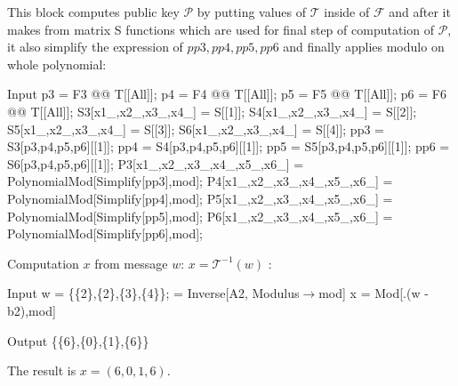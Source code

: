 \documentclass[thesis=M,english]{FITthesis}[2019/12/23]
\begin{document}
\noindent
This block computes public key $\mathcal{P}$ by putting values of $\mathcal{T}$ inside of $\mathcal{F}$ and after it makes from matrix S functions which are used for final step of computation of $\mathcal{P}$, it also simplify the expression of $pp3,pp4,pp5,pp6$ and finally applies modulo on whole polynomial:
\begin{mmaCell}[moredefined={p3, p4, p5, p6, S3, S4, S5, S6, mod, P3, P4, P5, P6, pp3,pp4,pp5,pp6, F3, F4, F5,F6, T, S},morepattern={x1_, x2_, x3_, x4_, x5_, x6_}]{Input}
p3 = F3 @@ T[[All]];
p4 = F4 @@ T[[All]];
p5 = F5 @@ T[[All]];
p6 = F6 @@ T[[All]];
S3[x1_,x2_,x3_,x4_] = S[[1]];
S4[x1_,x2_,x3_,x4_] = S[[2]];
S5[x1_,x2_,x3_,x4_] = S[[3]];
S6[x1_,x2_,x3_,x4_] = S[[4]];
pp3 = S3[p3,p4,p5,p6][[1]];
pp4 = S4[p3,p4,p5,p6][[1]];
pp5 = S5[p3,p4,p5,p6][[1]];
pp6 = S6[p3,p4,p5,p6][[1]];
P3[x1_,x2_,x3_,x4_,x5_,x6_] = PolynomialMod[Simplify[pp3],mod];
P4[x1_,x2_,x3_,x4_,x5_,x6_] = PolynomialMod[Simplify[pp4],mod];
P5[x1_,x2_,x3_,x4_,x5_,x6_] = PolynomialMod[Simplify[pp5],mod];
P6[x1_,x2_,x3_,x4_,x5_,x6_] = PolynomialMod[Simplify[pp6],mod];
\end{mmaCell}

\noindent
Computation $x$ from message $w$: $x = \mathcal{T}^{-1}(w)$ :
\begin{mmaCell}[moredefined={w, A2, b2, S, x, mod}]{Input}
w = \{\{2\},\{2\},\{3\},\{4\}\};
 = Inverse[A2, Modulus\(\pmb{\to}\)mod]
x = Mod[.(w - b2),mod]
\end{mmaCell}
\begin{mmaCell}{Output}
  \{\{6\},\{0\},\{1\},\{6\}\}
\end{mmaCell}

\noindent
The result is $x = (6,0,1,6)$.
\end{document}
